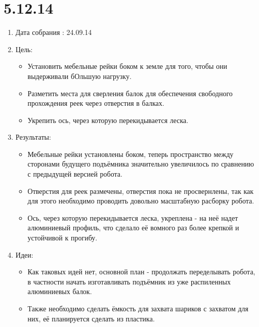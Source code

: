 \documentclass[12pt]{article}
\begin{document}
  \section{5.12.14}
  \begin{enumerate}
    \item Дата собрания : 24.09.14
    \item Цель:
    \begin{itemize}
      \item Установить мебельные рейки боком к земле для того, чтобы они выдерживали бОльшую нагрузку.
      \item Разметить места для сверления балок для обеспечения свободного прохождения реек через отверстия в балках.
      \item Укрепить ось, через которую перекидывается леска.
    \end{itemize}
    \item Результаты:
    \begin{itemize}
      \item Мебельные рейки установлены боком, теперь пространство между сторонами будущего подъёмника значительно увеличилось по сравнению с предыдущей версией робота.
      \item Отверстия для реек размечены, отверстия пока не просвернлены, так как для этого необходимо проводить довольно масштабную расборку робота.
      \item Ось, через которую перекидывается леска, укреплена - на неё надет алюминиевый профиль, что сделало её вомного раз более крепкой и устойчивой к прогибу.
    \end{itemize} 
    \item Идеи:
    \begin{itemize}
    	\item Как таковых идей нет, основной план - продолжать переделывать робота, в частности начать изготавливать подъёмник из уже распиленных алюминиевых балок.
    	\item Также необходимо сделать ёмкость для захвата шариков с захватом для них, её планируется сделать из пластика.
    \end{itemize}
   \end{enumerate}
  
\end{document}
